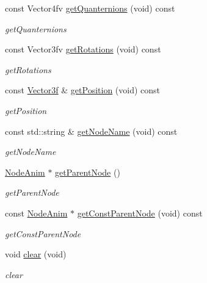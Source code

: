\begin{DoxyCompactItemize}
const Vector4fv \hyperlink{classEngine_1_1NodeAnim_a5271f3a9ae728cff69911c15b2697ed5}{get\+Quanternions} (void) const 
\begin{DoxyCompactList}\small\item\em get\+Quanternions \end{DoxyCompactList}\item 
const Vector3fv \hyperlink{classEngine_1_1NodeAnim_a92a5f6cb255cf632cfec5f503d5a15d2}{get\+Rotations} (void) const 
\begin{DoxyCompactList}\small\item\em get\+Rotations \end{DoxyCompactList}\item 
const \hyperlink{classVector3}{Vector3f} \& \hyperlink{classEngine_1_1NodeAnim_a17413937ec2344aec8c5c13306f6bdad}{get\+Position} (void) const 
\begin{DoxyCompactList}\small\item\em get\+Position \end{DoxyCompactList}\item 
const std\+::string \& \hyperlink{classEngine_1_1NodeAnim_a8e343fd13892a06a7e894176f37755cd}{get\+Node\+Name} (void) const 
\begin{DoxyCompactList}\small\item\em get\+Node\+Name \end{DoxyCompactList}\item 
\hyperlink{classEngine_1_1NodeAnim}{Node\+Anim} $\ast$ \hyperlink{classEngine_1_1NodeAnim_ab2b8660cf74433045cfbaf9e9c2e8cdc}{get\+Parent\+Node} ()
\begin{DoxyCompactList}\small\item\em get\+Parent\+Node \end{DoxyCompactList}\item 
const \hyperlink{classEngine_1_1NodeAnim}{Node\+Anim} $\ast$ \hyperlink{classEngine_1_1NodeAnim_aee5b3b5484ac623393a8e241c7bf8428}{get\+Const\+Parent\+Node} (void) const 
\begin{DoxyCompactList}\small\item\em get\+Const\+Parent\+Node \end{DoxyCompactList}\item 
void \hyperlink{classEngine_1_1NodeAnim_a71b9b346eb551284dffb86f2dab4a68d}{clear} (void)
\begin{DoxyCompactList}\small\item\em clear \end{DoxyCompactList}\end{DoxyCompactItemize}


